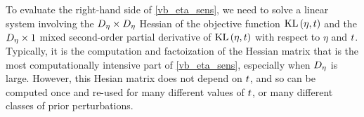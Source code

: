 To evaluate the right-hand side of \eqref{vb_eta_sens}, we need to solve a
linear system involving the $D_{\eta} \times D_{\eta}$ Hessian of the objective
function $\mathrm{KL}\left(\eta, t\right)$ and the $D_{\eta} \times 1$ mixed second-order partial
derivative of $\mathrm{KL}\left(\eta, t\right)$ with respect to $\eta$ and $t$.  Typically, it is
the computation and factoization of the Hessian matrix that is the most
computationally intensive part of \eqref{vb_eta_sens}, especially when $D_{\eta}$
is large.  However, this Hesian matrix does not depend on $t$, and so can be
computed once and re-used for many different values of $t$, or many different
classes of prior perturbations.

%
